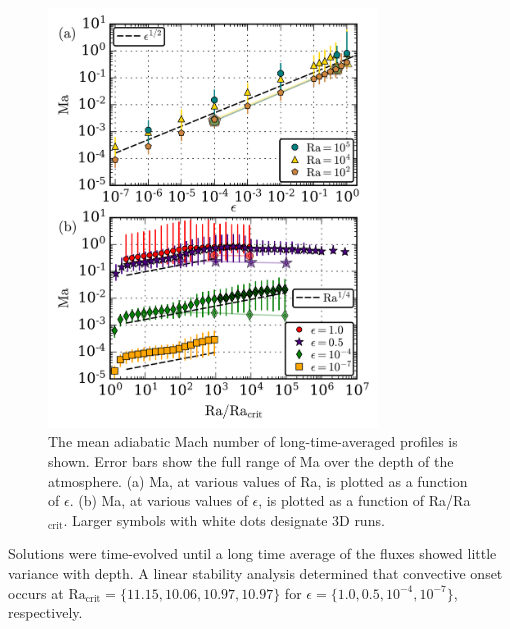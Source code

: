 \documentclass[aps, prl, twocolumn, nofootinbib, groupedaddress, amsfonts, amssymb, amsmath]{revtex4-1}
\begin{document}
\begin{figure}[t]
\includegraphics[width=3.4375in]{./figs/ma_v_Ra.png}
\caption{The mean adiabatic Mach number of long-time-averaged profiles
is shown.  Error bars show the full range of Ma over the depth of the
atmosphere.
(a) Ma, at various values of Ra, 
is plotted as a function of $\epsilon$.
(b) Ma, at various values of $\epsilon$, 
is plotted as a function of Ra/Ra$_{\text{crit}}$.
Larger symbols with white dots designate 3D runs.
\label{fig:ma_v_eps} }
\end{figure}


Solutions were time-evolved until a long time average of the fluxes
showed little
variance with depth. A linear stability analysis determined
that convective onset
occurs at $\text{Ra}_{\text{crit}} = \{11.15, 10.06, 10.97, 10.97\}$ 
for $\epsilon = \{1.0, 0.5, 10^{-4}, 10^{-7}\}$, respectively.  
\end{document}
